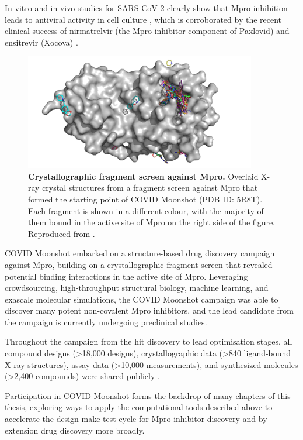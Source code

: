 In vitro and in vivo studies for SARS-CoV-2 clearly show that Mpro inhibition leads to antiviral activity in cell culture \cite{zhang2020covid, jin2020structure}, which is corroborated by the recent clinical success of nirmatrelvir (the Mpro inhibitor component of Paxlovid) \cite{Dafydd2021Paxlovid} and ensitrevir (Xocova) \cite{Mukae2022Ensitrelvirphase2a, Mukae2022Ensitrelvirphase2b}.

\begin{figure}[ht]
    \centering 
    \includegraphics[width=0.9\textwidth]{Chapters/Background/Figs/mpro_fragments.png}
    \caption{\textbf{Crystallographic fragment screen against Mpro.} Overlaid X-ray crystal structures from a fragment screen against Mpro that formed the starting point of COVID Moonshot (PDB ID: 5R8T). Each fragment is shown in a different colour, with the majority of them bound in the active site of Mpro on the right side of the figure. Reproduced from \cite{diamond_xchem}.}
    \label{fig:frag_screen}
\end{figure}

COVID Moonshot embarked on a structure-based drug discovery campaign against Mpro, building on a crystallographic fragment screen that revealed potential binding interactions in the active site of Mpro. Leveraging crowdsourcing, high-throughput structural biology, machine learning, and exascale molecular simulations, the COVID Moonshot campaign was able to discover many potent non-covalent Mpro inhibitors, and the lead candidate from the campaign is currently undergoing preclinical studies.

Throughout the campaign from the hit discovery to lead optimisation stages, all compound designs (>18,000 designs), crystallographic data (>840 ligand-bound X-ray structures), assay data (>10,000 measurements), and synthesized molecules (>2,400 compounds) were shared publicly \cite{moonshot2020}.

Participation in COVID Moonshot forms the backdrop of many chapters of this thesis, exploring ways to apply the computational tools described above to accelerate the design-make-test cycle for Mpro inhibitor discovery and by extension drug discovery more broadly. 






